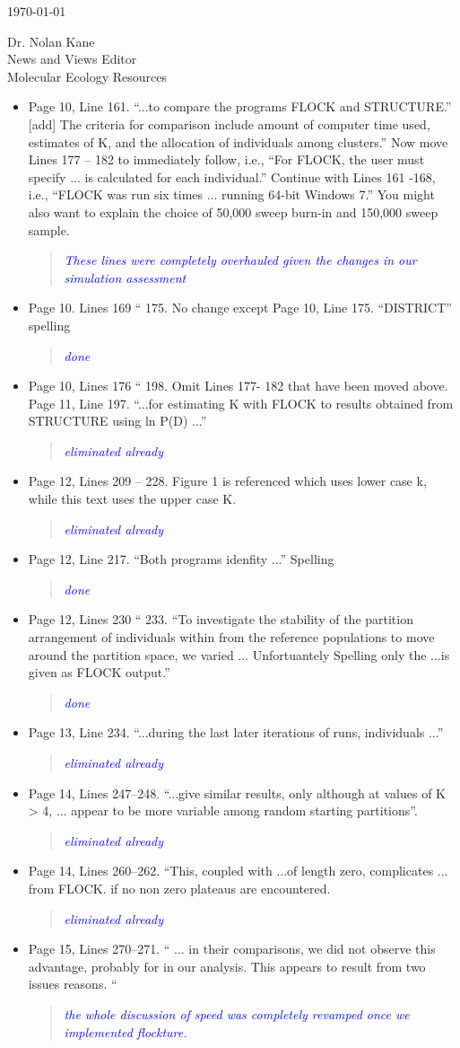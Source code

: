 \documentclass[11pt]{letter}
\newcommand{\reply}[1]{\begin{quotation}\small\sl\textcolor{blue}{#1}\end{quotation}}
\begin{document}
\begin{letter}{ \today 

Dr. Nolan Kane\\
News and Views Editor\\
Molecular Ecology Resources \\
}
\begin{itemize}
\reply{This line was removed/changed in a previous edit}
\item Page 10, Line 161. ``...to compare the programs FLOCK and STRUCTURE.'' [add] The criteria for comparison include amount of computer time used, estimates of K, and the allocation of individuals among clusters.'' Now move Lines 177 -- 182 to immediately follow, i.e., ``For FLOCK, the user must specify ... is calculated for each individual.'' Continue with Lines 161 -168, i.e., ``FLOCK was run six times ... running 64-bit Windows 7.'' You might also want to explain the choice of 50,000 sweep burn-in and 150,000 sweep sample.
\reply{These lines were completely overhauled given the changes in our simulation assessment}
\item Page 10. Lines 169 `` 175. No change except Page 10, Line 175. ``DISTRICT'' spelling
\reply{done}
\item Page 10, Lines 176 `` 198. Omit Lines 177- 182 that have been moved above. Page 11, Line 197. ``...for estimating K with FLOCK to results obtained from
STRUCTURE using ln P(D) ...''
\reply{eliminated already}
\item Page 12, Lines 209 -- 228. Figure 1 is referenced which uses lower case k, while this text
uses the upper case K.
\reply{eliminated already}
\item Page 12, Line 217. ``Both programs idenfity ...'' Spelling
\reply{done}
\item Page 12, Lines 230 `` 233. ``To investigate the stability of the partition arrangement of individuals within from the reference populations to move around the partition space, we varied ... Unfortuantely Spelling only the ...is given as FLOCK output.''
\reply{done}
\item Page 13, Line 234. ``...during the last later iterations of runs, individuals ...''
\reply{eliminated already}
\item Page 14, Lines 247--248. ``...give similar results, only although at values of K > 4, ...
appear to be more variable among random starting partitions''.
\reply{eliminated already}
\item Page 14, Lines 260--262. ``This, coupled with ...of length zero, complicates ... from
FLOCK. if no non zero plateaus are encountered.
\reply{eliminated already}
\item Page 15, Lines 270--271. `` ... in their comparisons, we did not observe this advantage,
probably for in our analysis. This appears to result from two issues reasons. ``
\reply{the whole discussion of speed was completely revamped once we implemented {\sc flockture}.}

\end{itemize}
\end{letter}
\end{document}
